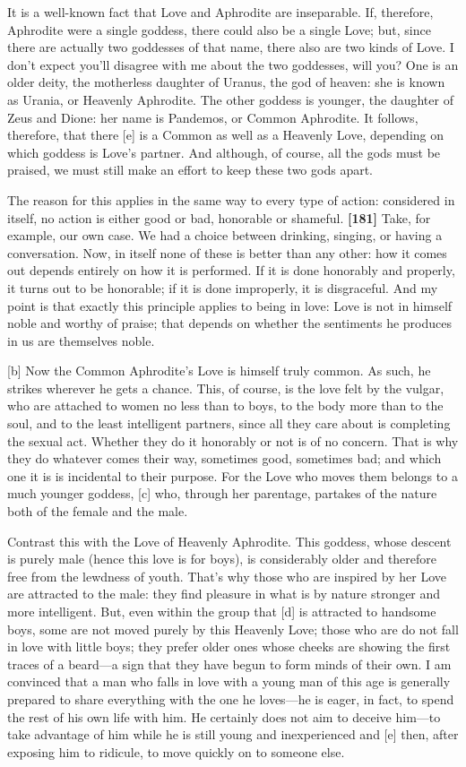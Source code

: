 It is a well-known fact that Love and Aphrodite are inseparable. If,
therefore, Aphrodite were a single goddess, there could also be a single
Love; but, since there are actually two goddesses of that name, there
also are two kinds of Love. I don't expect you'll disagree with me about
the two goddesses, will you? One is an older deity, the motherless
daughter of Uranus, the god of heaven: she is known as Urania, or
Heavenly Aphrodite. The other goddess is younger, the daughter of Zeus
and Dione: her name is Pandemos, or Common Aphrodite. It follows,
therefore, that there {[}e{]} is a Common as well as a Heavenly Love,
depending on which goddess is Love's partner. And although, of course,
all the gods must be praised, we must still make an effort to keep these
two gods apart.

The reason for this applies in the same way to every type of action:
considered in itself, no action is either good or bad, honorable or
shameful. {\bf {[}181{]}} Take, for example, our own case. We had a
choice between drinking, singing, or having a conversation. Now, in
itself none of these is better than any other: how it comes out depends
entirely on how it is performed. If it is done honorably and properly,
it turns out to be honorable; if it is done improperly, it is
disgraceful. And my point is that exactly this principle applies to
being in love: Love is not in himself noble and worthy of praise; that
depends on whether the sentiments he produces in us are themselves
noble.

{[}b{]} Now the Common Aphrodite's Love is himself truly common. As
such, he strikes wherever he gets a chance. This, of course, is the love
felt by the vulgar, who are attached to women no less than to boys, to
the body more than to the soul, and to the least intelligent partners,
since all they care about is completing the sexual act. Whether they do
it honorably or not is of no concern. That is why they do whatever comes
their way, sometimes good, sometimes bad; and which one it is is
incidental to their purpose. For the Love who moves them belongs to a
much younger goddess, {[}c{]} who, through her parentage, partakes of
the nature both of the female and the male.

Contrast this with the Love of Heavenly Aphrodite. This goddess, whose
descent is purely male (hence this love is for boys), is considerably
older and therefore free from the lewdness of youth. That's why those
who are inspired by her Love are attracted to the male: they find
pleasure in what is by nature stronger and more intelligent. But, even
within the group that {[}d{]} is attracted to handsome boys, some are
not moved purely by this Heavenly Love; those who are do not fall in
love with little boys; they prefer older ones whose cheeks are showing
the first traces of a beard---a sign that they have begun to form minds
of their own. I am convinced that a man who falls in love with a young
man of this age is generally prepared to share everything with the one
he loves---he is eager, in fact, to spend the rest of his own life with
him. He certainly does not aim to deceive him---to take advantage of him
while he is still young and inexperienced and {[}e{]} then, after
exposing him to ridicule, to move quickly on to someone else.

